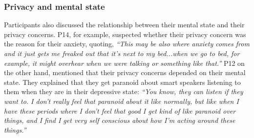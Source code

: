     \subsubsection{Privacy and mental state}
    Participants also discussed the relationship between their mental state and their privacy concerns.
    P14, for example, suspected whether their privacy concern was the reason for their anxiety, quoting,
	    \textit{%
	    ``This may be also where anxiety comes from and it just gets me freaked out that it's next to my bed...when we go to bed, for example, it might overhear when we were talking or something like that.''
	    }
    P12 on the other hand, mentioned that their privacy concerns depended on their mental state. They explained that they get paranoid about smart speakers listening to them when they are in their depressive state:
            \textit{
            ``You know, they can listen if they want to. I don't really feel that paranoid about it like normally, but like when I have these periods where I don't feel that good I get kind of like paranoid over things, and I find I get very self conscious about how I'm acting around these things.''
            }
        
        

    
